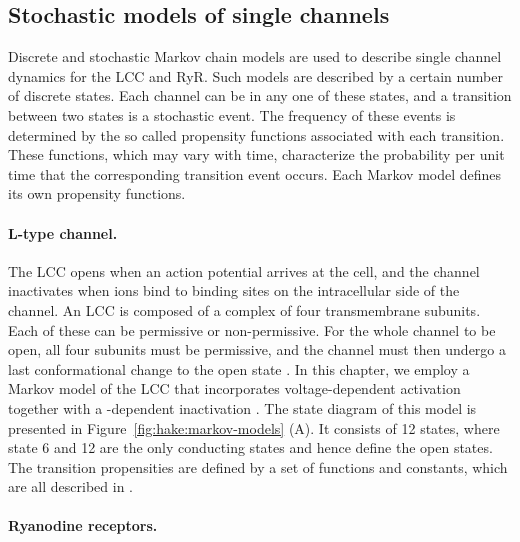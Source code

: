 \subsection{Stochastic models of single channels}
\label{sec:hake:stochastic-models}
   

Discrete and stochastic Markov chain models are used to describe
single channel dynamics for the LCC and RyR. Such models are described
by a certain number of discrete states. Each channel can be in any one
of these states, and a transition between two states is a stochastic
event. The frequency of these events is determined by the so called
propensity functions associated with each transition. These functions,
which may vary with time, characterize the probability per unit time
that the corresponding transition event occurs. Each Markov model
defines its own propensity functions.

\paragraph{L-type \Ca channel.}
\label{sec:hake:lcc}


The LCC opens when an action potential
arrives at the cell, and the channel inactivates when \Ca ions bind to
binding sites on the intracellular side of the channel. An LCC is
composed of a complex of four transmembrane subunits. Each of these
can be permissive or non-permissive. For the whole channel to be open,
all four subunits must be permissive, and the channel must then
undergo a last conformational change to the open state
\citep{Hille2001}. In this chapter, we employ a Markov model of the LCC
that incorporates voltage-dependent activation together with a
\Ca-dependent inactivation
\citep{JafriRiceWinslow1998,GreensteinWinslow2002}. The state diagram
of this model is presented in Figure~\ref{fig:hake:markov-models}
(A). It consists of 12 states, where state 6 and 12 are the
only conducting states and hence define the open states. The
transition propensities are defined by a set of functions and
constants, which are all described in \citet{GreensteinWinslow2002}.

\paragraph{Ryanodine receptors.}
\label{sec:hake:ryr}

